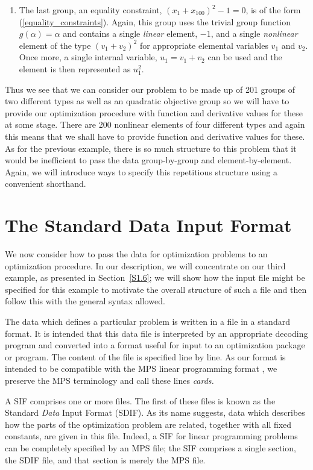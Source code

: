 \documentclass[a4paper]{article}
\newcommand{\req}[1]{(\ref{#1})}
\begin{document}
\begin{enumerate}
\item
The last group,
an equality constraint,
$(x_1 + x_{100} )^2 -  1 = 0$,
is of the  form  \req{equality_constraints}.
Again, this  group  uses  the trivial  group function
$g ( \alpha ) = \alpha$ and  contains  a single  {\em linear}
element,
$-1$, and a single {\em nonlinear} element
of the type $( v_1 + v_2 )^2$ for appropriate elemental variables
$v_1$ and  $v_2$.  Once
more, a single internal  variable,
$u_1 = v_1 +  v_2$ can be used  and
the element is then represented as $u_1^2$.
\end{enumerate}

Thus we see  that we can consider  our problem to be  made  up of  201
groups  of  two  different  types as well as an quadratic objective group
so  we   will  have to  provide  our
optimization procedure  with function and  derivative values
for  these at  some stage.   There are 200  nonlinear elements
of  four different types  and again this  means that we  shall have to
provide function and derivative
values for these.  As for the previous
example,  there is so  much structure
to this  problem that it would be  inefficient to pass the  data group-by-group
and  element-by-element.    Again, we will   introduce ways   to  specify this
repetitious structure using a convenient shorthand.

\section{\label{S2}The Standard Data Input Format}
\setcounter{figure}{0}

We now consider how to pass the data  for optimization  problems to
an  optimization procedure.  In  our  description, we will concentrate  on our
third example, as presented in Section~\ref{S1.6};  we will show how the input
file might be specified for this example to motivate the overall structure
of such  a file and
then follow this with the general syntax allowed.

The data which defines a particular problem is  written in a file in a
standard format. It is intended that this data  file is interpreted by
an appropriate decoding program and converted into a format useful for
input to an optimization package or program.  The  content of the file
is specified line by line. As our format is intended to  be compatible
with the MPS linear programming
format \cite{IBM69}, we preserve  the  MPS terminology and  call these
lines {\em cards.}

A SIF comprises one or more files.
The first of these files is known as the Standard {\em Data} Input
Format (SDIF).
As its name suggests,
data which describes how the parts of the optimization problem are
related, together with all fixed constants, are given in this file.
Indeed, a SIF for linear programming
problems can be completely specified by an MPS
file; the  SIF comprises  a single section,  the  SDIF file, and  that
section is merely the MPS file.
\end{document}
